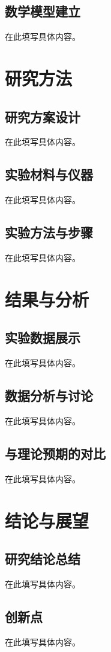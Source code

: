 \documentclass[a4paper,12pt,oneside]{ctexart}
\begin{document}
\subsection{数学模型建立}
在此填写具体内容。


\section{研究方法}
\subsection{研究方案设计}
在此填写具体内容。

\subsection{实验材料与仪器}
在此填写具体内容。

\subsection{实验方法与步骤}
在此填写具体内容。


\section{结果与分析}
\subsection{实验数据展示}
在此填写具体内容。

\subsection{数据分析与讨论}
在此填写具体内容。

\subsection{与理论预期的对比}
在此填写具体内容。


\section{结论与展望}
\subsection{研究结论总结}
在此填写具体内容。

\subsection{创新点}
在此填写具体内容。
\end{document}
